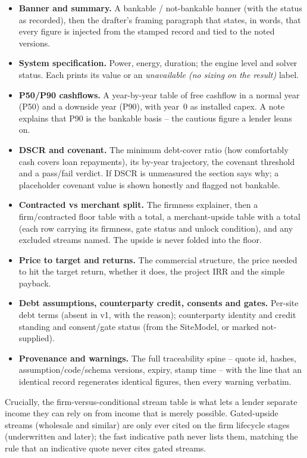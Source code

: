 \begin{itemize}
  \item \textbf{Banner and summary.} A bankable / not-bankable banner (with the status as recorded), then the drafter's framing paragraph that states, in words, that every figure is injected from the stamped record and tied to the noted versions.
  \item \textbf{System specification.} Power, energy, duration; the engine level and solver status. Each prints its value or an \emph{unavailable (no sizing on the result)} label.
  \item \textbf{P50/P90 cashflows.} A year-by-year table of free cashflow in a normal year (P50) and a downside year (P90), with year~0 as installed capex. A note explains that P90 is the bankable basis -- the cautious figure a lender leans on.
  \item \textbf{DSCR and covenant.} The minimum debt-cover ratio (how comfortably cash covers loan repayments), its by-year trajectory, the covenant threshold and a pass/fail verdict. If DSCR is unmeasured the section says why; a placeholder covenant value is shown honestly and flagged not bankable.
  \item \textbf{Contracted vs merchant split.} The firmness explainer, then a firm/contracted floor table with a total, a merchant-upside table with a total (each row carrying its firmness, gate status and unlock condition), and any excluded streams named. The upside is never folded into the floor.
  \item \textbf{Price to target and returns.} The commercial structure, the price needed to hit the target return, whether it does, the project IRR and the simple payback.
  \item \textbf{Debt assumptions, counterparty credit, consents and gates.} Per-site debt terms (absent in v1, with the reason); counterparty identity and credit standing and consent/gate status (from the SiteModel, or marked not-supplied).
  \item \textbf{Provenance and warnings.} The full traceability spine -- quote id, hashes, assumption/code/schema versions, expiry, stamp time -- with the line that an identical record regenerates identical figures, then every warning verbatim.
\end{itemize}

Crucially, the firm-versus-conditional stream table is what lets a lender separate income they can rely on from income that is merely possible. Gated-upside streams (wholesale and similar) are only ever cited on the firm lifecycle stages (underwritten and later); the fast indicative path never lists them, matching the rule that an indicative quote never cites gated streams.

